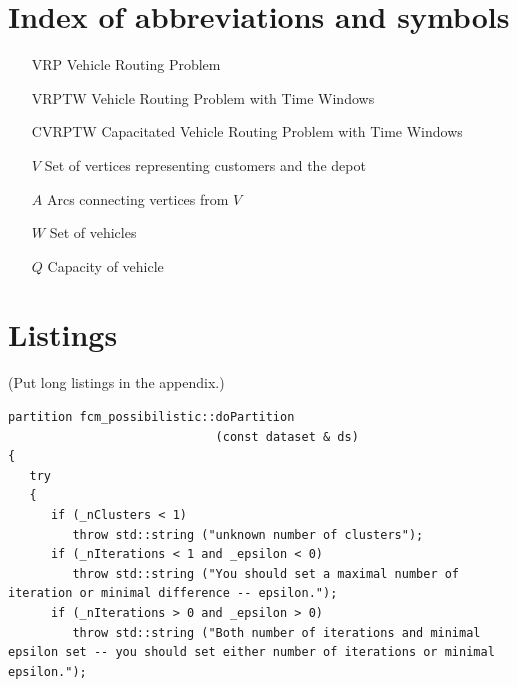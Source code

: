 \documentclass[a4paper,twoside,12pt]{book}
\newcounter{PagesWithoutNumbers}
\begin{document}
 

 


\backmatter
{}
\setcounter{page}{\value{PagesWithoutNumbers}}

\pagestyle{onlyPageNumbers}

%
%

\printbibliography

\begin{appendices} 


 

\chapter*{Index of abbreviations and symbols}

\begin{itemize}
\item[VRP] Vehicle Routing Problem
\item[VRPTW] Vehicle Routing Problem with Time Windows
\item[CVRPTW] Capacitated Vehicle Routing Problem with Time Windows
\item[$V$] Set of vertices representing customers and the depot
\item[$A$] Arcs connecting vertices from $V$
\item[$W$] Set of vehicles
\item[$Q$] Capacity of vehicle
\end{itemize}


\chapter*{Listings}

(Put long listings in the appendix.)

\begin{lstlisting}
partition fcm_possibilistic::doPartition
                             (const dataset & ds)
{
   try
   {
      if (_nClusters < 1)
         throw std::string ("unknown number of clusters");
      if (_nIterations < 1 and _epsilon < 0)
         throw std::string ("You should set a maximal number of iteration or minimal difference -- epsilon.");
      if (_nIterations > 0 and _epsilon > 0)
         throw std::string ("Both number of iterations and minimal epsilon set -- you should set either number of iterations or minimal epsilon.");
   

\end{lstlisting}
\end{appendices}
\end{document}
